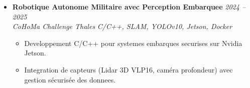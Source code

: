 \documentclass[a4paper,11pt]{article}
\begin{document}
\begin{itemize}[leftmargin=*, label={-}]
\item \textbf{Robotique Autonome Militaire avec Perception Embarquee} \hfill \textit{2024 -- 2025} \\
\textit{CoHoMa Challenge Thales} \hfill \textit{C/C++, SLAM, YOLOv10, Jetson, Docker}
\vspace{-2pt}
    \begin{itemize}[leftmargin=0.4cm, nosep, label=\tiny$\bullet$]
        \item \small{Developpement C/C++ pour systemes embarques securises sur Nvidia Jetson.}
        \item \small{Integration de capteurs (Lidar 3D VLP16, caméra profondeur) avec gestion sécurisée des donnees.}
    \end{itemize}

\end{itemize}
\end{document}
